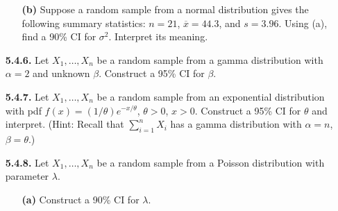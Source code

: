 \begin{enumerate}
\begin{enumerate}
        \item[\textbf{(b)}] Suppose a random sample from a normal distribution gives the following summary statistics: $n = 21$, $\overline{x} = 44.3$, and $s = 3.96$. Using (a), find a 90\% CI for $\sigma^2$. Interpret its meaning.
    \end{enumerate}
    \item[\textbf{5.4.6.}] Let $X_1, \ldots, X_n$ be a random sample from a gamma distribution with $\alpha = 2$ and unknown $\beta$. Construct a 95\% CI for $\beta$.
    \item[\textbf{5.4.7.}] Let $X_1, \ldots, X_n$ be a random sample from an exponential distribution with pdf $f(x) = (1/\theta)e^{-x/\theta}$, $\theta > 0$, $x > 0$. Construct a 95\% CI for $\theta$ and interpret. (Hint: Recall that $\sum_{i=1}^{n} X_i$ has a gamma distribution with $\alpha = n$, $\beta = \theta$.)
    \item[\textbf{5.4.8.}] Let $X_1, \ldots, X_n$ be a random sample from a Poisson distribution with parameter $\lambda$.
    \begin{enumerate}
        \item[\textbf{(a)}] Construct a 90\% CI for $\lambda$.
    \end{enumerate}
\end{enumerate}
